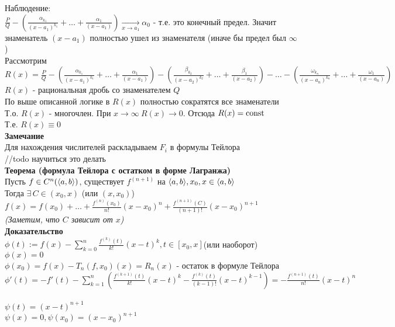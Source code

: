 \documentclass[12pt]{article}
\begin{document}
Наблюдение:\\
$\frac{P}{Q} - (\frac{\alpha_{k_1}}{(x-a_1)^{k_1}} + \ldots + \frac{\alpha_1}{(x-a_1)}) \xrightarrow[x\rightarrow a_1]{} \alpha_0$ - т.е. это конечный предел. Значит знаменатель $(x-a_1)$ полностью ушел из знаменателя (иначе бы предел был $\infty$)\\
Рассмотрим $R(x) = \frac{P}{Q} - (\frac{\alpha_{k_1}}{(x-a_1)^{k_1}} + \ldots + \frac{\alpha_1}{(x-a_1)}) - (\frac{\beta_{k_2}}{(x-a_2)^{k_2}} + \ldots + \frac{\beta_1}{(x-a_2)}) - \ldots - (\frac{\omega_{k_n}}{(x-a_n)^{k_n}} + \ldots + \frac{\omega_1}{(x-a_n)})$\\
$R(x)$ - рациональная дробь со знаменателем $Q$\\
По выше описанной логике в $R(x)$ полностью сократятся все знаменатели\\
Т.о. $R(x)$ - многочлен. При $x \rightarrow \infty\ R(x) \rightarrow 0$. Отсюда $R(x) = \operatorname{const}$\\
Т.е. $R(x) \equiv 0$\\
\textbf{Замечание}\\
Для нахождения числителей раскладываем $F_i$ в формулы Тейлора\\
//todo научиться это делать\\
\textbf{Теорема (формула Тейлора с остатком в форме Лагранжа)}\\
Пусть $f \in C^n(\langle a, b \rangle)$, существует $f^{(n+1)}$ на $\langle a, b \rangle, x_0, x \in \langle a, b \rangle$\\
Тогда $\exists\,C \in (x_0, x)$ (или $(x, x_0)$)\\
$f(x) = f(x_0) + \ldots + \frac{f^{(n)}(x_0)}{n!}(x-x_0)^n + \frac{f^{(n+1)}(C)}{(n+1)!}(x-x_0)^{n+1}$\\
\textit{(Заметим, что $C$ зависит от $x$)}\\
\textbf{Доказательство}\\
$\phi(t) := f(x) - \sum_{k=0}^n \frac{f^{(k)}(t)}{k!}(x-t)^k, t \in [x_0, x]$(или наоборот)\\
$\phi(x) = 0$\\
$\phi(x_0) = f(x) - T_n(f, x_0)(x) = R_n(x)$ - остаток в формуле Тейлора\\
$\phi'(t) = -f'(t)-\sum_{k=1}^n(\frac{f^{(k+1)}(t)}{k!}(x-t)^k - \frac{f^{(k)}(t)}{(k-1)!}(x-t)^{k-1}) = -\frac{f^{(n+1)}(t)}{n!}(x-t)^n$\\\\
$\psi(t) = (x-t)^{n+1}$\\
$\psi(x) = 0, \psi(x_0) = (x-x_0)^{n+1}$\\
\end{document}
